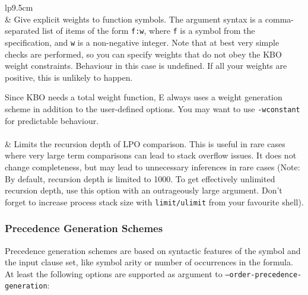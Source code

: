 \documentclass{report}
\begin{document}
\begin{supertabular}{lp{9.5cm}}
  \\
  & Give explicit weights to function symbols. The argument syntax is
  a comma-separated list of items of the form \texttt{f:w}, where
  \texttt{f} is a symbol from the specification, and \texttt{w} is a
  non-negative integer. Note that at best very simple checks are
  performed, so you can specify weights that do not obey the KBO
  weight constraints. Behaviour in this case is undefined. If all your
  weights are positive, this is unlikely to happen.

  Since KBO needs a total weight function, E always uses a weight
  generation scheme in addition to the user-defined options. You may
  want to use \texttt{-wconstant} for predictable behaviour.\\[1ex]

  \\
  & Limits the recursion depth of LPO comparison. This is useful in rare
  cases where very large term comparisons can lead to stack overflow
  issues. It does not change completeness, but may lead to unnecessary
  inferences in rare cases (Note: By default, recursion depth is
  limited to 1000. To get effectively unlimited recursion depth, use
  this option with an outrageously large argument. Don't forget to
  increase process stack size with \texttt{limit/ulimit} from your
  favourite shell).\\
\end{supertabular}

\subsubsection{Precedence Generation Schemes}

Precedence generation schemes are based on syntactic features of the
symbol and the input clause set, like symbol arity or number of
occurrences in the formula. At least the following options are
supported as argument to \texttt{--order-precedence-generation}:
\end{document}

